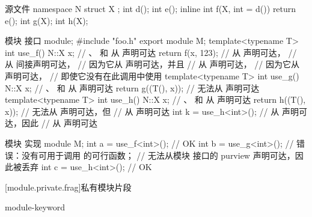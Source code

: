 \pnum
\begin{example}
\begin{codeblocktu}{源文件 }
namespace N {
  struct X {};
  int d();
  int e();
  inline int f(X, int = d()) { return e(); }
  int g(X);
  int h(X);
}
\end{codeblocktu}

\begin{codeblocktu}{模块  接口}
module;
#include "foo.h"
export module M;
template<typename T> int use_f() {
  N::X x;                       // 、 和 \tcode{::} 从  声明可达
  return f(x, 123);             //  从  声明可达，
                                //  从  间接声明可达，
                                //   因为它从  声明可达，并且
                                //  从  声明可达，
                                //   因为它从  声明可达，
                                //   即使它没有在此调用中使用
}
template<typename T> int use_g() {
  N::X x;                       // 、 和 \tcode{::} 从  声明可达
  return g((T(), x));           //  无法从  声明可达
}
template<typename T> int use_h() {
  N::X x;                       // 、 和 \tcode{::} 从  声明可达
  return h((T(), x));           //  无法从  声明可达，但
                                //  从  声明可达
}
int k = use_h<int>();
  //  从  声明可达，因此
  //  从  声明可达
\end{codeblocktu}

\begin{codeblocktu}{模块  实现}
module M;
int a = use_f<int>();           // OK
int b = use_g<int>();           // 错误：没有可用于调用  的可行函数；
                                //  无法从模块  接口的 purview 声明可达，因此被丢弃
int c = use_h<int>();           // OK
\end{codeblocktu}
\end{example}

[module.private.frag]{私有模块片段}

\begin{bnf}
\br
    module-keyword \terminal{:}  \terminal{;} 
\end{bnf}

